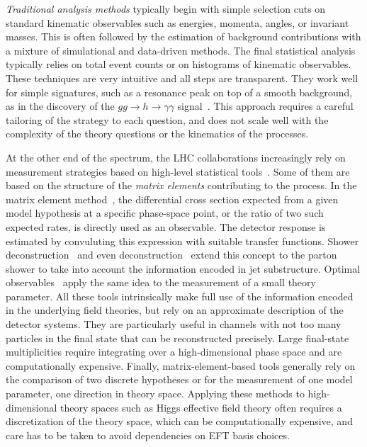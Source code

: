 \emph{Traditional analysis methods} typically begin with simple
selection cuts on standard kinematic observables such as energies,
momenta, angles, or invariant masses. This is often followed by the
estimation of background contributions with a mixture of simulational
and data-driven methods. The final statistical analysis typically
relies on total event counts or on histograms of kinematic
observables.  These techniques are very intuitive and all steps are
transparent. They work well for simple signatures, such as a
resonance peak on top of a smooth background, as in the discovery of
the $gg \to h \to \gamma \gamma$
signal~\cite{Aad:2012tfa,Chatrchyan:2012xdj}. This approach requires a
careful tailoring of the strategy to each question, and does not scale
well with the complexity of the theory questions or the kinematics of
the processes.

At the other end of the spectrum, the LHC collaborations increasingly
rely on measurement strategies based on high-level statistical
tools~\cite{cranmer:nips2016}. Some of them are based on the structure
of the \emph{matrix elements} contributing to the process. In the
matrix element method~\cite{Kondo:1988yd, Abazov:2004cs, Gao:2010qx,
  Alwall:2010cq, Avery:2012um, Andersen:2012kn, Campbell:2013hz,
  Artoisenet:2013vfa, Martini:2015fsa, Gritsan:2016hjl}, the
differential cross section expected from a given model hypothesis at a
specific phase-space point, or the ratio of two such expected rates,
is directly used as an observable. The detector response is estimated
by convuluting this expression with suitable transfer
functions. Shower deconstruction~\cite{Soper:2011cr, Soper:2012pb} and
even deconstruction~\cite{Soper:2014rya} extend this concept to the
parton shower to take into account the information encoded in jet
substructure. Optimal observables~\cite{Atwood:1991ka, Davier:1992nw,
  Diehl:1993br} apply the same idea to the measurement of a small
theory parameter. All these tools intrinsically make full use of the
information encoded in the underlying field theories, but rely on an
approximate description of the detector systems. They are particularly
useful in channels with not too many particles in the final state that
can be reconstructed precisely. Large final-state multiplicities
require integrating over a high-dimensional phase space and are
computationally expensive. Finally, matrix-element-based tools
generally rely on the comparison of two discrete hypotheses or for the
measurement of one model parameter, \ie one direction in theory
space. Applying these methods to high-dimensional theory spaces such
as Higgs effective field theory often requires a discretization of the
theory space, which can be computationally expensive, and care has to
be taken to avoid dependencies on EFT basis choices.

